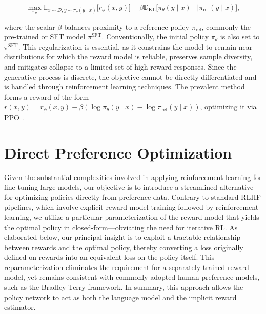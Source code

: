 \begin{equation}\label{eq:RL}
\max_{\pi_{\theta}}  \mathbb{E}_{x\sim \mathcal{D}, y\sim \pi_{\theta}(y \mid x)}\bigl[r_{\phi}(x, y)\bigr] - \beta\mathbb{D}_{\textrm{KL}}\bigl[\pi_{\theta}(y\mid x)\mid \mid \pi_\text{ref}(y\mid x)\bigr],
\end{equation}

where the scalar $\beta$ balances proximity to a reference policy $\pi_\text{ref}$, commonly the pre-trained or SFT model $\pi^\text{SFT}$. Conventionally, the initial policy $\pi_\theta$ is also set to $\pi^\text{SFT}$. This regularization is essential, as it constrains the model to remain near distributions for which the reward model is reliable, preserves sample diversity, and mitigates collapse to a limited set of high-reward responses. Since the generative process is discrete, the objective cannot be directly differentiated and is handled through reinforcement learning techniques. The prevalent method \citep{ziegler2020finetuning, stiennon2022learning, bai2022training, ouyang2022training} forms a reward of the form ${r(x, y) = r_{\phi}(x, y) -\beta (\log \pi_{\theta}(y\mid x) - \log \pi_\text{ref}(y\mid x))}$, optimizing it via PPO \cite{schulman2017proximal}.

\section{Direct Preference Optimization}\label{sec:DPO}

Given the substantial complexities involved in applying reinforcement learning for fine-tuning large models, our objective is to introduce a streamlined alternative for optimizing policies directly from preference data. Contrary to standard RLHF pipelines, which involve explicit reward model training followed by reinforcement learning, we utilize a particular parameterization of the reward model that yields the optimal policy in closed-form—obviating the need for iterative RL. As elaborated below, our principal insight is to exploit a tractable relationship between rewards and the optimal policy, thereby converting a loss originally defined on rewards into an equivalent loss on the policy itself. This reparameterization eliminates the requirement for a separately trained reward model, yet remains consistent with commonly adopted human preference models, such as the Bradley-Terry framework. In summary, this approach allows the policy network to act as both the language model and the implicit reward estimator.


